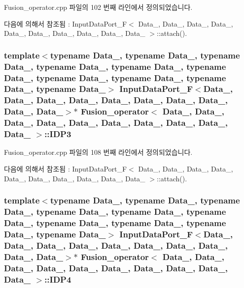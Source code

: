 Fusion\+\_\+operator.\+cpp 파일의 102 번째 라인에서 정의되었습니다.



다음에 의해서 참조됨 \+:  Input\+Data\+Port\+\_\+\+F$<$ Data\+\_, Data\+\_, Data\+\_, Data\+\_, Data\+\_, Data\+\_, Data\+\_, Data\+\_, Data\+\_, Data\+\_ $>$\+::attach().

\subsubsection[{\texorpdfstring{I\+D\+P3}{IDP3}}]{\setlength{\rightskip}{0pt plus 5cm}template$<$typename Data\+\_, typename Data\+\_, typename Data\+\_, typename Data\+\_, typename Data\+\_, typename Data\+\_, typename Data\+\_, typename Data\+\_, typename Data\+\_, typename Data\+\_$>$ {\bf Input\+Data\+Port\+\_\+F}$<$Data\+\_, Data\+\_, Data\+\_, Data\+\_, Data\+\_, Data\+\_, Data\+\_, Data\+\_, Data\+\_, Data\+\_$>$$\ast$ {\bf Fusion\+\_\+operator}$<$ Data\+\_, Data\+\_, Data\+\_, Data\+\_, Data\+\_, Data\+\_, Data\+\_, Data\+\_, Data\+\_, Data\+\_ $>$\+::I\+D\+P3}\hypertarget{classFusion__operator_ae053a7964cd7ba4422303dddda22bb8c}{}\label{classFusion__operator_ae053a7964cd7ba4422303dddda22bb8c}


Fusion\+\_\+operator.\+cpp 파일의 108 번째 라인에서 정의되었습니다.



다음에 의해서 참조됨 \+:  Input\+Data\+Port\+\_\+\+F$<$ Data\+\_, Data\+\_, Data\+\_, Data\+\_, Data\+\_, Data\+\_, Data\+\_, Data\+\_, Data\+\_, Data\+\_ $>$\+::attach().

\subsubsection[{\texorpdfstring{I\+D\+P4}{IDP4}}]{\setlength{\rightskip}{0pt plus 5cm}template$<$typename Data\+\_, typename Data\+\_, typename Data\+\_, typename Data\+\_, typename Data\+\_, typename Data\+\_, typename Data\+\_, typename Data\+\_, typename Data\+\_, typename Data\+\_$>$ {\bf Input\+Data\+Port\+\_\+F}$<$Data\+\_, Data\+\_, Data\+\_, Data\+\_, Data\+\_, Data\+\_, Data\+\_, Data\+\_, Data\+\_, Data\+\_$>$$\ast$ {\bf Fusion\+\_\+operator}$<$ Data\+\_, Data\+\_, Data\+\_, Data\+\_, Data\+\_, Data\+\_, Data\+\_, Data\+\_, Data\+\_, Data\+\_ $>$\+::I\+D\+P4}\hypertarget{classFusion__operator_a087dec92bca6e8c5c9f3a8c033db66c2}{}\label{classFusion__operator_a087dec92bca6e8c5c9f3a8c033db66c2}


